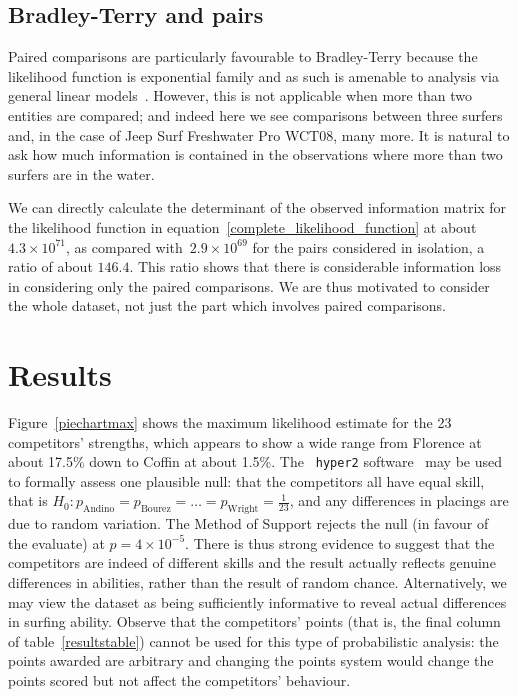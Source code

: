 \documentclass{article}
\begin{document}
\subsection{Bradley-Terry and pairs}

Paired comparisons are particularly favourable to Bradley-Terry
because the likelihood function is exponential family and as such is
amenable to analysis via general linear models~\citep{turner2012}.
However, this is not applicable when more than two entities are
compared; and indeed here we see comparisons between three surfers
and, in the case of Jeep Surf Freshwater Pro WCT08, many more.  It
is natural to ask how much information is contained in the
observations where more than two surfers are in the water.

We can directly calculate the determinant of the observed information
matrix for the likelihood function in
equation~\ref{complete_likelihood_function} at about $4.3\times
10^{71}$, as compared with~$2.9\times 10^{69}$ for the pairs
considered in isolation, a ratio of about $146.4$.  This ratio shows
that there is considerable information loss in considering only the
paired comparisons.  We are thus motivated to consider the whole
dataset, not just the part which involves paired comparisons.

\section{Results}

Figure~\ref{piechartmax} shows the maximum likelihood estimate for the
23 competitors' strengths, which appears to show a wide range from
Florence at about 17.5\% down to Coffin at about 1.5\%.  The {\tt
  hyper2} software~\citep{hankin2017} may be used to formally assess
one plausible null: that the competitors all have equal skill, that is
$H_0\colon p_\mathrm{Andino} = p_\mathrm{Bourez}=\ldots=
p_\mathrm{Wright}=\frac{1}{23}$, and any differences in placings are
due to random variation.  The Method of Support \citep{edwards1992}
rejects the null (in favour of the evaluate) at $p=4\times 10^{-5}$.
There is thus strong evidence to suggest that the competitors are
indeed of different skills and the result actually reflects genuine
differences in abilities, rather than the result of random chance.
Alternatively, we may view the dataset as being sufficiently
informative to reveal actual differences in surfing ability.  Observe
that the competitors' points (that is, the final column of
table~\ref{resultstable}) cannot be used for this type of
probabilistic analysis: the points awarded are arbitrary and changing
the points system would change the points scored but not affect the
competitors' behaviour.
\end{document}
